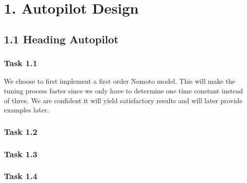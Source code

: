 \section*{1. Autopilot Design}
\subsection*{1.1 Heading Autopilot}

\subsubsection*{Task 1.1}
We choose to first implement a first order Nomoto model. This will make the tuning process faster since we only have to determine one time constant instead of three. We are confident it will yield satisfactory results and will later provide examples later.  

\subsubsection*{Task 1.2}
\subsubsection*{Task 1.3}
\subsubsection*{Task 1.4}
